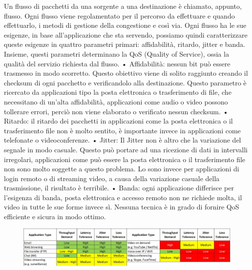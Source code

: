 Un flusso di pacchetti da una sorgente a una destinazione è chiamato, appunto, flusso.
Ogni flusso viene regolamentato per il percorso da effettuare e quando effettuarlo, i metodi di gestione della congestione e così via.
Ogni flusso ha le sue esigenze, in base all’applicazione che sta servendo, possiamo quindi caratterizzare queste esigenze in quattro parametri primari: affidabilità, ritardo, jitter e banda. Insieme, questi parametri determinano la QoS (Quality of Service), ossia la qualità del servizio richiesta dal flusso.
•	Affidabilità: nessun bit può essere trasmesso in modo scorretto. Questo obiettivo viene di solito raggiunto creando il checksum di ogni pacchetto e verificandolo alla destinazione. Questo parametro è ricercato da applicazioni tipo la posta elettronica o trasferimento di file, che necessitano di un’alta affidabilità, applicazioni come audio o video possono tollerare errori, perciò non viene elaborato o verificato nessun checksum.
•	Ritardo: il ritardo dei pacchetti in applicazioni come la posta elettronica o il trasferimento file non è molto sentito, è importante invece in applicazioni come telefonate o videoconferenze.
•	Jitter: Il Jitter non è altro che la variazione del segnale in modo casuale. Questo può portare ad una ricezione di dati in intervalli irregolari, applicazioni come può essere la posta elettronica o il trasferimento file non sono molto soggette a questo problema. Lo sono invece per applicazioni di login remoto o di streaming video, a causa della variazione casuale della trasmissione, il risultato è terribile.
•	Banda: ogni applicazione differisce per l’esigenza di banda, posta elettronica e accesso remoto non ne richiede molta, il video in tutte le sue forme invece sì.
Nessuna tecnica è in grado di fornire QoS efficiente e sicura in modo ottimo. 

\begin{figure}[H]
\centering
\includegraphics[scale=0.3]{res/img/40_QoS.png}
\end{figure}

